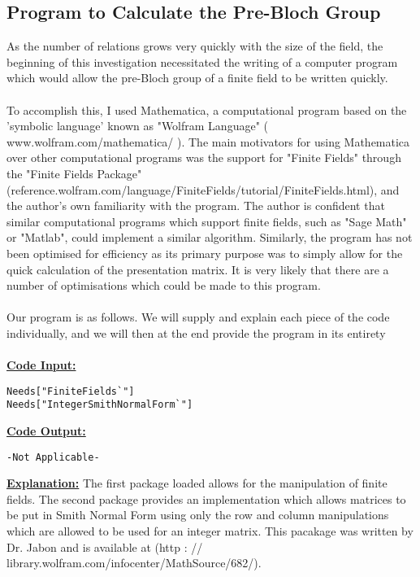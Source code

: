 \documentclass[11pt]{article}
\theoremstyle{plain}
\theoremstyle{definition}
\begin{document}
\subsection{Program to Calculate the Pre-Bloch Group }\label{section:Computational Program}
As the number of relations grows very quickly with the size of the field, the beginning of this investigation necessitated the writing of a computer program which would allow the pre-Bloch group of a finite field to be written quickly. \\
\\
To accomplish this, I used Mathematica, a computational program based on the 'symbolic language' known as "Wolfram Language" ( www.wolfram.com/mathematica/ ). The main motivators for using Mathematica over other computational programs was the support for "Finite Fields" through the "Finite Fields Package" (reference.wolfram.com/language/FiniteFields/tutorial/FiniteFields.html), and the author's own familiarity with the program. The author is confident that similar computational programs which support finite fields, such as "Sage Math" or "Matlab", could implement a similar algorithm. Similarly, the program has not been optimised for efficiency as its primary purpose was to simply allow for the quick calculation of the presentation matrix. It is very likely that there are a number of optimisations which could be made to this program.\\
\\
Our program is as follows. We will supply and explain each piece of the code individually, and we will then at the end provide the program in its entirety\\
\\
\textbf{\underline{Code Input:}}
\begin{verbatim}
Needs["FiniteFields`"]
Needs["IntegerSmithNormalForm`"] 
\end{verbatim}
\textbf{\underline{Code Output:}}
\begin{verbatim}
-Not Applicable-
\end{verbatim}
 \textbf{\underline{Explanation:}} The first package loaded allows for the manipulation of finite fields. The second package provides an implementation which allows matrices to be put in Smith Normal Form using only the row and column manipulations which are allowed to be used for an integer matrix. This pacakage was written by Dr. Jabon and is available at (http : // library.wolfram.com/infocenter/MathSource/682/).\\
 \\
\end{document}
